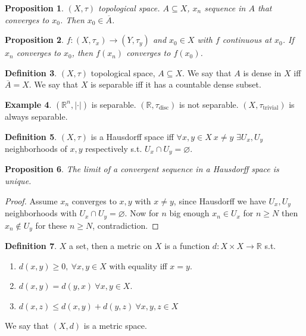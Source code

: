 \documentclass[11pt,a4paper]{article}
\theoremstyle{definition}
\newtheorem{definition}{Definition}[section]
\newtheorem{example}[definition]{Example}
\theoremstyle{plain}
\newtheorem{proposition}[definition]{Proposition}
\theoremstyle{remark}
\newcommand{\R}{\mathbb{R}}
\newcommand{\abs}[1]{\lvert #1 \rvert}
\newcommand{\1}{\mathbbm{1}}
\begin{document}
\begin{proposition}
    $(X, \tau)$ topological space. $A \subseteq X$, $x_n$ sequence in $A$ that converges to $x_0$. Then $x_0 \in \overline{A}$. 
\end{proposition}

\begin{proposition}
    $f \colon (X, \tau_x) \to (Y, \tau_y)$ and $x_0 \in X$ with $f$ continuous at $x_0$. If $x_n$ converges to $x_0$, then $f(x_n)$ converges to $f(x_0)$.
\end{proposition}

\begin{definition}
    $(X, \tau)$ topological space, $A \subseteq X$. We say that $A$ is dense in $X$ iff $\overline{A} = X$. We say that $X$ is separable iff it has a countable dense subset.
\end{definition}

\begin{example}
    $(\R^n, \abs{\cdot})$ is separable. $(\R, \tau_{\text{disc}})$ is not separable. $(X, \tau_{\text{trivial}})$ is always separable.
\end{example}

\begin{definition}
    $(X, \tau)$ is a Hausdorff space iff $\forall x, y \in X \ x \ne y$ $\exists U_x, U_y$ neighborhoods of $x, y$ respectively s.t. 
    $U_x \cap U_y = \varnothing$.
\end{definition}

\begin{proposition}
    The limit of a convergent sequence in a Hausdorff space is unique.
\end{proposition}

\begin{proof}
    Assume $x_n$ converges to $x, y$ with $x \ne y$, since Hausdorff we have $U_x, U_y$ neighborhoods with $U_x \cap U_y = \varnothing$. Now for $n$ big enough 
    $x_n \in U_x$ for $n \ge N$ then $x_n \not\in U_y$ for these $n \ge N$, contradiction.
\end{proof}

\begin{definition}
    $X$ a set, then a metric on $X$ is a function $d \colon X \times X \to \R$ s.t. 
    \begin{enumerate}
        \item $d(x, y) \ge 0, \ \forall x, y \in X$ with equality iff $x = y$. 
        \item $d(x, y) = d(y,x) \ \forall x, y \in X$. 
        \item $d(x, z) \le d(x,y) + d(y, z) \ \forall x,y,z \in X$
    \end{enumerate} 
    We say that $(X, d)$ is a metric space.
\end{definition}
\end{document}
